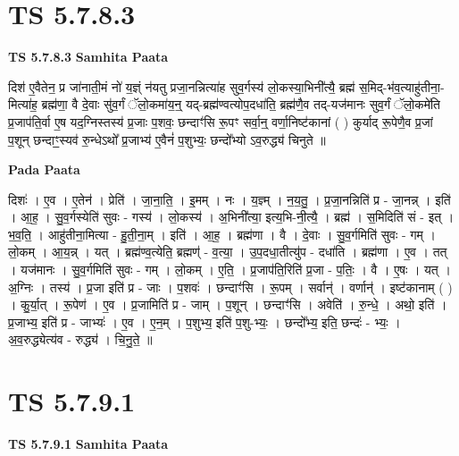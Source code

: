 \documentclass[17pt]{extarticle}
\begin{document}
\section*{ TS 5.7.8.3 }

\textbf{TS 5.7.8.3 } \newline
\textbf{Samhita Paata} \newline

दिश॑ ए॒वैतेन॒ प्र जा॑नाती॒मं नो॑ य॒ज्ञ्ं न॑यतु प्रजा॒नन्नित्या॑ह सुव॒र्गस्य॑ लो॒कस्या॒भिनी᳚त्यै॒ ब्रह्म॑ स॒मिद्-भ॑व॒त्याहु॑तीना॒-मित्या॑ह॒ ब्रह्म॑णा॒ वै दे॒वाः सु॑व॒र्गं ॅलो॒कमा॑य॒न्॒ यद्-ब्रह्म॑ण्वत्योप॒दधा॑ति॒ ब्रह्म॑णै॒व तद्-यज॑मानः सुव॒र्गं ॅलो॒कमे॑ति प्र॒जाप॑ति॒र्वा ए॒ष यद॒ग्निस्तस्य॑ प्र॒जाः प॒शवः॒ छन्दाꣳ॑सि रू॒पꣳ सर्वा॒न्॒ वर्णा॒निष्ट॑कानां ( ) कुर्याद् रू॒पेणै॒व प्र॒जां प॒शून् छन्दाꣳ॒॒स्यव॑ रु॒न्धेऽथो᳚ प्र॒जाभ्य॑ ए॒वैनं॑ प॒शुभ्यः॒ छन्दो᳚भ्यो ऽव॒रुद्ध्य॑ चिनुते ॥ \newline

\textbf{Pada Paata} \newline

दिशः॑ । ए॒व । ए॒तेन॑ । प्रेति॑ । जा॒ना॒ति॒ । इ॒मम् । नः । य॒ज्ञ्म् । न॒य॒तु॒ । प्र॒जा॒नन्निति॑ प्र - जा॒नन्न् । इति॑ । आ॒ह॒ । सु॒व॒र्गस्येति॑ सुवः - गस्य॑ । लो॒कस्य॑ । अ॒भिनी᳚त्या॒ इत्य॒भि-नी॒त्यै॒ । ब्रह्म॑ । स॒मिदिति॑ सं - इत् । भ॒व॒ति॒ । आहु॑तीना॒मित्या - हु॒ती॒ना॒म् । इति॑ । आ॒ह॒ । ब्रह्म॑णा । वै । दे॒वाः । सु॒व॒र्गमिति॑ सुवः - गम् । लो॒कम् । आ॒य॒न्न् । यत् । ब्रह्म॑ण्व॒त्येति॒ ब्रह्मण्॑ - व॒त्या॒ । उ॒प॒दधा॒तीत्यु॑प - दधा॑ति । ब्रह्म॑णा । ए॒व । तत् । यज॑मानः । सु॒व॒र्गमिति॑ सुवः - गम् । लो॒कम् । ए॒ति॒ । प्र॒जाप॑ति॒रिति॑ प्र॒जा - प॒तिः॒ । वै । ए॒षः । यत् । अ॒ग्निः । तस्य॑ । प्र॒जा इति॑ प्र - जाः । प॒शवः॑ । छन्दाꣳ॑सि । रू॒पम् । सर्वान्॑ । वर्णान्॑ । इष्ट॑कानाम् ( ) । कु॒र्या॒त् । रू॒पेण॑ । ए॒व । प्र॒जामिति॑ प्र - जाम् । प॒शून् । छन्दाꣳ॑सि । अवेति॑ । रु॒न्धे॒ । अथो॒ इति॑ । प्र॒जाभ्य॒ इति॑ प्र - जाभ्यः॑ । ए॒व । ए॒न॒म् । प॒शुभ्य॒ इति॑ प॒शु-भ्यः॒ । छन्दो᳚भ्य॒ इति॒ छन्दः॑ - भ्यः॒ । अ॒व॒रुद्ध्येत्य॑व - रुद्ध्य॑ । चि॒नु॒ते॒ ॥  \newline




\section*{ TS 5.7.9.1 }

\textbf{TS 5.7.9.1 } \newline
\textbf{Samhita Paata} \newline
\end{document}
